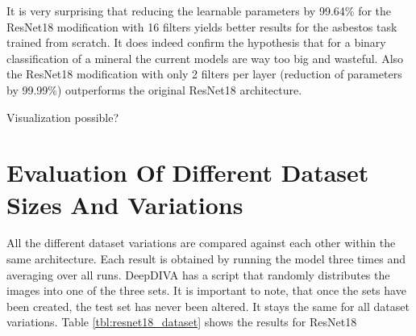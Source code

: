 It is very surprising that reducing the learnable parameters by 99.64\% for the ResNet18 modification with 16 filters yields better results for the asbestos task trained from scratch. It does indeed confirm the hypothesis that for a binary classification of a mineral the current models are way too big and wasteful. Also the ResNet18 modification with only 2 filters per layer (reduction of parameters by 99.99\%) outperforms the original ResNet18 architecture.

Visualization possible?






\section{Evaluation Of Different Dataset Sizes And Variations}

All the different dataset variations are compared against each other within the same architecture. Each result is obtained by running the model three times and averaging over all runs. DeepDIVA has a script that randomly distributes the images into one of the three sets. It is important to note, that once the sets have been created, the test set has never been altered. It stays the same for all dataset variations. Table \ref{tbl:resnet18_dataset} shows the results for ResNet18

\begin{table}[h] \centering
{}
\caption{Dataset variations with ResNet18. The first column shows how the datasets performed when trained from scratch whereas the second column shows how the datasets performed with pre-training.}
\label{tbl:resnet18_dataset}
\end{table}

